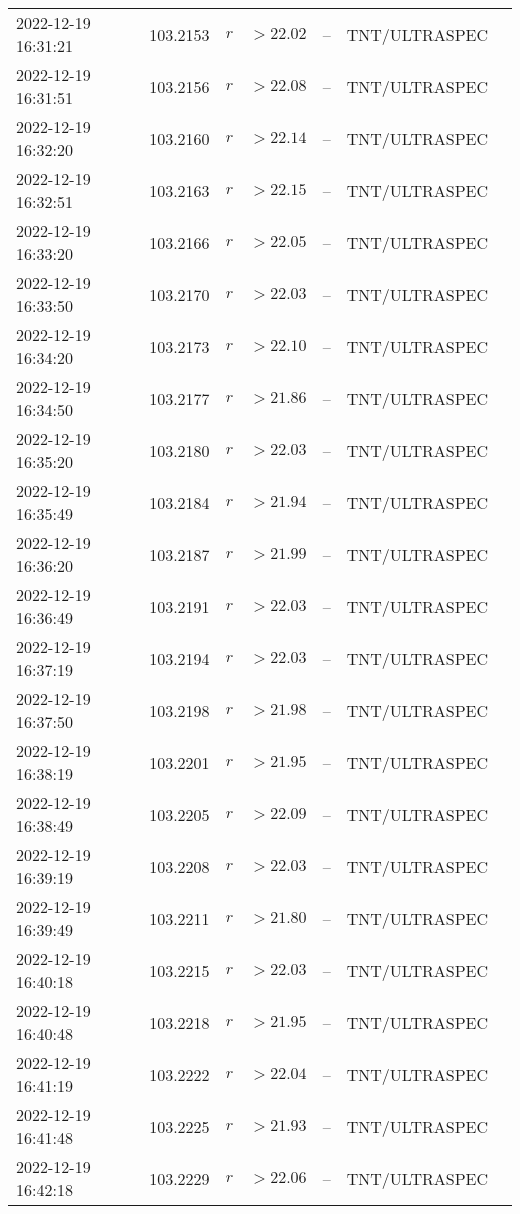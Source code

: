 \documentclass{nature_plusfigure}
\begin{document}
\begin{supplement}
\begin{center}
\begin{longtable}{lllllll}
2022-12-19 16:31:21 & 103.2153 & $r$ & $>22.02$ & -- & TNT/ULTRASPEC &  \\ 
2022-12-19 16:31:51 & 103.2156 & $r$ & $>22.08$ & -- & TNT/ULTRASPEC &  \\ 
2022-12-19 16:32:20 & 103.2160 & $r$ & $>22.14$ & -- & TNT/ULTRASPEC &  \\ 
2022-12-19 16:32:51 & 103.2163 & $r$ & $>22.15$ & -- & TNT/ULTRASPEC &  \\ 
2022-12-19 16:33:20 & 103.2166 & $r$ & $>22.05$ & -- & TNT/ULTRASPEC &  \\ 
2022-12-19 16:33:50 & 103.2170 & $r$ & $>22.03$ & -- & TNT/ULTRASPEC &  \\ 
2022-12-19 16:34:20 & 103.2173 & $r$ & $>22.10$ & -- & TNT/ULTRASPEC &  \\ 
2022-12-19 16:34:50 & 103.2177 & $r$ & $>21.86$ & -- & TNT/ULTRASPEC &  \\ 
2022-12-19 16:35:20 & 103.2180 & $r$ & $>22.03$ & -- & TNT/ULTRASPEC &  \\ 
2022-12-19 16:35:49 & 103.2184 & $r$ & $>21.94$ & -- & TNT/ULTRASPEC &  \\ 
2022-12-19 16:36:20 & 103.2187 & $r$ & $>21.99$ & -- & TNT/ULTRASPEC &  \\ 
2022-12-19 16:36:49 & 103.2191 & $r$ & $>22.03$ & -- & TNT/ULTRASPEC &  \\ 
2022-12-19 16:37:19 & 103.2194 & $r$ & $>22.03$ & -- & TNT/ULTRASPEC &  \\ 
2022-12-19 16:37:50 & 103.2198 & $r$ & $>21.98$ & -- & TNT/ULTRASPEC &  \\ 
2022-12-19 16:38:19 & 103.2201 & $r$ & $>21.95$ & -- & TNT/ULTRASPEC &  \\ 
2022-12-19 16:38:49 & 103.2205 & $r$ & $>22.09$ & -- & TNT/ULTRASPEC &  \\ 
2022-12-19 16:39:19 & 103.2208 & $r$ & $>22.03$ & -- & TNT/ULTRASPEC &  \\ 
2022-12-19 16:39:49 & 103.2211 & $r$ & $>21.80$ & -- & TNT/ULTRASPEC &  \\ 
2022-12-19 16:40:18 & 103.2215 & $r$ & $>22.03$ & -- & TNT/ULTRASPEC &  \\ 
2022-12-19 16:40:48 & 103.2218 & $r$ & $>21.95$ & -- & TNT/ULTRASPEC &  \\ 
2022-12-19 16:41:19 & 103.2222 & $r$ & $>22.04$ & -- & TNT/ULTRASPEC &  \\ 
2022-12-19 16:41:48 & 103.2225 & $r$ & $>21.93$ & -- & TNT/ULTRASPEC &  \\ 
2022-12-19 16:42:18 & 103.2229 & $r$ & $>22.06$ & -- & TNT/ULTRASPEC &  \\ 

\end{longtable}
\end{center}
\end{supplement}
\end{document}
